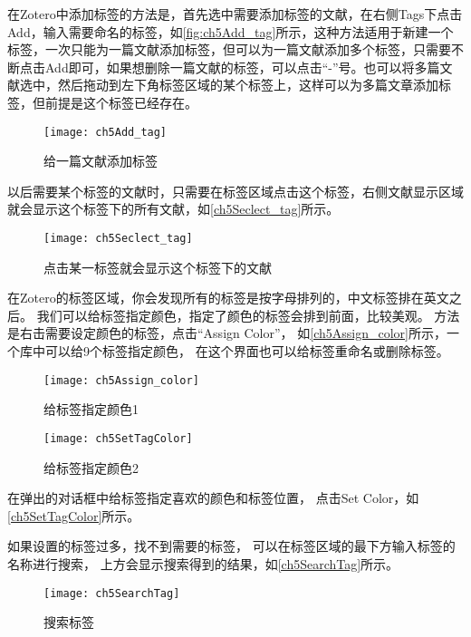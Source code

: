 \documentclass[cn,11pt,chinese]{elegantbook}
\begin{document}
			在Zotero中添加标签的方法是，首先选中需要添加标签的文献，在右侧Tags下点击Add，输入需要命名的标签，如\autoref{fig:ch5Add_tag}所示，这种方法适用于新建一个标签，一次只能为一篇文献添加标签，但可以为一篇文献添加多个标签，只需要不断点击Add即可，如果想删除一篇文献的标签，可以点击“-”号。也可以将多篇文献选中，然后拖动到左下角标签区域的某个标签上，这样可以为多篇文章添加标签，但前提是这个标签已经存在。
				\begin{figure}[htbp]
					\centering
					\texttt{[image: ch5Add\_tag]}
					\caption{给一篇文献添加标签}
					\label{fig:ch5Add_tag}
				\end{figure}
			
			以后需要某个标签的文献时，只需要在标签区域点击这个标签，右侧文献显示区域就会显示这个标签下的所有文献，如\autoref{ch5Seclect_tag}所示。
				\begin{figure}[htbp]
					\centering
					\texttt{[image: ch5Seclect\_tag]}
					\caption{点击某一标签就会显示这个标签下的文献}
					\label{ch5Seclect_tag}
				\end{figure}
			
			在Zotero的标签区域，你会发现所有的标签是按字母排列的，中文标签排在英文之后。
			我们可以给标签指定颜色，指定了颜色的标签会排到前面，比较美观。
			方法是右击需要设定颜色的标签，点击“Assign Color”，
			如\autoref{ch5Assign_color}所示，一个库中可以给9个标签指定颜色，
			在这个界面也可以给标签重命名或删除标签。
				\begin{figure}[htbp]
					\begin{minipage}[t]{\dimexpr0.5\textwidth-4em}
						\centering
						\texttt{[image: ch5Assign\_color]}
						\caption{给标签指定颜色1}
						\label{ch5Assign_color}
					\end{minipage}
					\begin{minipage}[t]{\dimexpr0.5\textwidth-4em}
						\centering
						\texttt{[image: ch5SetTagColor]}
						\caption{给标签指定颜色2}
						\label{ch5SetTagColor}
					\end{minipage}
			\end{figure}	
					
					
					
				
				
在弹出的对话框中给标签指定喜欢的颜色和标签位置，
点击Set Color，如\autoref{ch5SetTagColor}所示。
				
				如果设置的标签过多，找不到需要的标签，
				可以在标签区域的最下方输入标签的名称进行搜索，
				上方会显示搜索得到的结果，如\autoref{ch5SearchTag}所示。
				\begin{figure}[htbp]
					\centering
					\texttt{[image: ch5SearchTag]}
					\caption{搜索标签}
					\label{ch5SearchTag}
				\end{figure}
			
\end{document}
